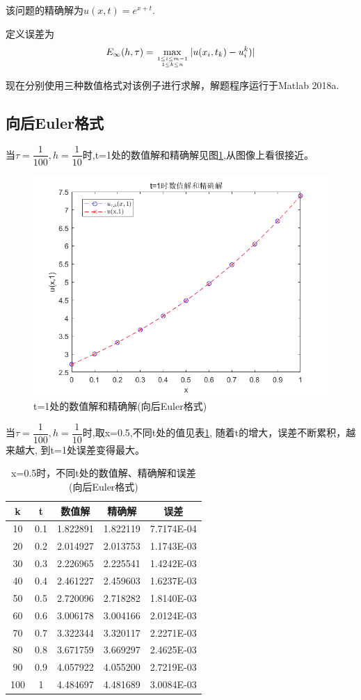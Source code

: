 \documentclass[withoutpreface,bwprint]{cumcmthesis} %
\begin{document}
该问题的精确解为$ u(x,t)=e^{x+t}$.

定义误差为$$ E_{\infty}(h,\tau)=\max \limits_{1 \leq i \leq m-1 \atop 1 \leq k \leq n } |u(x_{i},t_{k})-u_{i}^k)| $$

现在分别使用三种数值格式对该例子进行求解，解题程序运行于Matlab 2018a.
\subsection{向后Euler格式}
当$\tau=\dfrac{1}{100},h=\dfrac{1}{10}$时,t=1处的数值解和精确解见图\ref{fig:f1},从图像上看很接近。
\begin{figure}
	\centering
	\includegraphics[width=0.7\linewidth]{figures/f1}
	\caption{t=1处的数值解和精确解(向后Euler格式)}
	\label{fig:f1}
\end{figure}

当$\tau=\dfrac{1}{100},h=\dfrac{1}{10}$时,取x=0.5,不同t处的值见表\ref{tab:1},
随着t的增大，误差不断累积，越来越大,
到t=1处误差变得最大。
\begin{table}[htbp]
	\centering
	\caption{x=0.5时，不同t处的数值解、精确解和误差(向后Euler格式)}
	\begin{tabular}{ccccc}
		\toprule[1.5pt]
		k     & t     & 数值解   & 精确解   & 误差 \\
		\midrule[1pt]
		10    & 0.1   & 1.822891  & 1.822119  & 7.7174E-04 \\
		20    & 0.2   & 2.014927  & 2.013753  & 1.1743E-03 \\
		30    & 0.3   & 2.226965  & 2.225541  & 1.4242E-03 \\
		40    & 0.4   & 2.461227  & 2.459603  & 1.6237E-03 \\
		50    & 0.5   & 2.720096  & 2.718282  & 1.8140E-03 \\
		60    & 0.6   & 3.006178  & 3.004166  & 2.0124E-03 \\
		70    & 0.7   & 3.322344  & 3.320117  & 2.2271E-03 \\
		80    & 0.8   & 3.671759  & 3.669297  & 2.4625E-03 \\
		90    & 0.9   & 4.057922  & 4.055200  & 2.7219E-03 \\
		100   & 1     & 4.484697  & 4.481689  & 3.0084E-03 \\
		\bottomrule[1.5pt]
	\end{tabular}%
	\label{tab:1}%
\end{table}%
\end{document}
